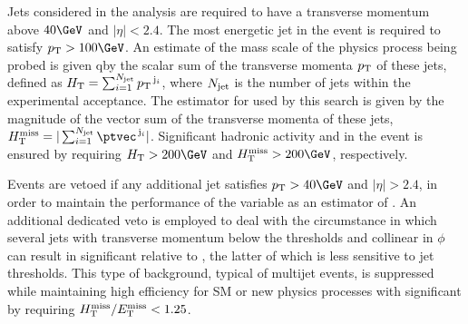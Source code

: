 Jets considered in the analysis are required to have a transverse
momentum above $40\GeV$ and $|\eta| < 2.4$. The most energetic jet in
the event is required to satisfy $\Pt > 100\GeV$. An estimate of the
mass scale of the physics process being probed is given qby the scalar
sum of the transverse momenta ${p_{\text T}}$ of these jets, defined as $H_{\mathrm{T}}
= \sum_{i=1}^{N_{\rm jet}} {p_{\text T}}^{\,\mathrm{j}_i}$, where $N_{\rm jet}$
is the number of jets within the experimental acceptance. The
estimator for \met used by this search is given by the magnitude of
the vector sum of the transverse momenta of these jets, $\mht =
|\sum_{i=1}^{N_\text{jet}} \ptvec^{\,\mathrm{j}_i}|$. Significant
hadronic activity and \ptvecmiss in the event is ensured by requiring
$\scalht > 200\GeV$ and $\mht > 200\GeV$, respectively.

Events are vetoed if any additional jet satisfies $\Pt > 40\GeV$ and
$|\eta| > 2.4$, in order to maintain the performance of the variable
\mht as an estimator of \met. An additional dedicated veto is employed
to deal with the circumstance in which several jets with transverse
momentum below the \Pt thresholds and collinear in $\phi$ can result
in significant \mht relative to \met, the latter of which is less
sensitive to jet thresholds. This type of background, typical of
multijet events, is suppressed while maintaining high efficiency for
SM or new physics processes with significant \ptvecmiss by requiring
$H_{\mathrm{T}}^{\text{miss}} / E_{\mathrm{T}}^{\text{miss}} < 1.25$.

